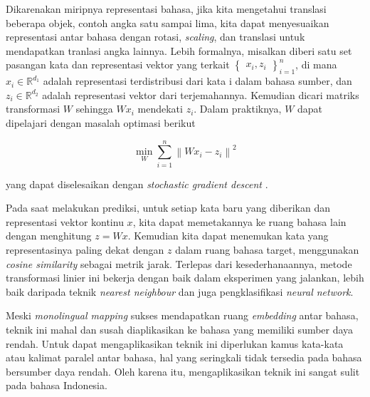     Dikarenakan miripnya representasi bahasa, jika kita mengetahui translasi beberapa objek, contoh angka satu sampai lima, kita dapat menyesuaikan representasi antar bahasa dengan rotasi, \textit{scaling}, dan translasi untuk mendapatkan tranlasi angka lainnya. Lebih formalnya, misalkan diberi satu set pasangan kata dan representasi vektor yang terkait \begin{math} \begin{Bmatrix} {x_{i}, z_{i}} \end{Bmatrix}_{i=1}^{n} \end{math}, di mana \(x_{i}\in\mathbb{R}^{d_{1}}\) adalah representasi terdistribusi dari kata i dalam bahasa sumber, dan \(z_{i}\in\mathbb{R}^{d_{2}}\) adalah representasi vektor dari terjemahannya. Kemudian dicari matriks transformasi \( W\) sehingga \(W x_{i}\) mendekati \(z_{i}\). Dalam praktiknya, \(W\) dapat dipelajari dengan masalah optimasi berikut

    \begin{equation}
        \min_{W}\sum_{i=1}^{n}\left \| Wx_i-z_i \right \|^2
        \label{eq:2}
    \end{equation}

    yang dapat diselesaikan dengan \textit{stochastic gradient descent} \parencite{MikolovExploiting}.

    Pada saat melakukan prediksi, untuk setiap kata baru yang diberikan dan representasi vektor kontinu \(x\), kita dapat memetakannya ke ruang bahasa lain dengan menghitung \(z = W x\). Kemudian kita dapat menemukan kata yang representasinya paling dekat dengan \(z\) dalam ruang bahasa target, menggunakan \textit{cosine similarity} sebagai metrik jarak. Terlepas dari kesederhanaannya, metode transformasi linier ini bekerja dengan baik dalam eksperimen yang \parencite{MikolovExploiting} jalankan, lebih baik daripada teknik \textit{nearest neighbour} dan juga pengklasifikasi \textit{neural network}.

    Meski \textit{monolingual mapping} sukses mendapatkan ruang \textit{embedding} antar bahasa, teknik ini mahal dan susah diaplikasikan ke bahasa yang memiliki sumber daya rendah. Untuk dapat mengaplikasikan teknik ini diperlukan kamus kata-kata atau kalimat paralel antar bahasa, hal yang seringkali tidak tersedia pada bahasa bersumber daya rendah. Oleh karena itu, mengaplikasikan teknik ini sangat sulit pada bahasa Indonesia. 

